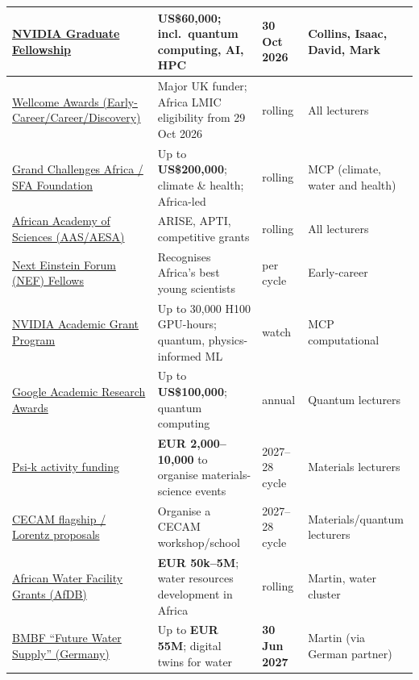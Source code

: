 \documentclass[11pt,a4paper]{article}
\begin{document}
\begin{longtable}{@{}p{3.4cm}p{5.6cm}p{2.2cm}p{2.7cm}@{}}
\midrule
\href{https://research.nvidia.com/graduate-fellowships}{NVIDIA Graduate Fellowship} & \textbf{US\$60{,}000}; incl.\ quantum computing, AI, HPC & \textbf{30 Oct 2026} & Collins, Isaac, David, Mark \\
\midrule
\href{https://wellcome.org/research-funding/guidance/prepare-to-apply/scheme-application-deadlines}{Wellcome Awards (Early-Career/Career/Discovery)} & Major UK funder; Africa LMIC eligibility from 29 Oct 2026 & rolling & All lecturers \\
\midrule
\href{https://scienceforafrica.foundation/}{Grand Challenges Africa / SFA Foundation} & Up to \textbf{US\$200{,}000}; climate \& health; Africa-led & rolling & MCP (climate, water and health) \\
\midrule
\href{https://calls.aasciences.africa/grants}{African Academy of Sciences (AAS/AESA)} & ARISE, APTI, competitive grants & rolling & All lecturers \\
\midrule
\href{https://en.wikipedia.org/wiki/Next_Einstein_Forum}{Next Einstein Forum (NEF) Fellows} & Recognises Africa's best young scientists & per cycle & Early-career \\
\midrule
\href{https://www.nvidia.com/en-us/industries/higher-education-research/academic-grant-program/}{NVIDIA Academic Grant Program} & Up to 30{,}000 H100 GPU-hours; quantum, physics-informed ML & watch & MCP computational \\
\midrule
\href{https://research.google/programs-and-events/google-academic-research-awards/}{Google Academic Research Awards} & Up to \textbf{US\$100{,}000}; quantum computing & annual & Quantum lecturers \\
\midrule
\href{https://psi-k.net/workshop-funding/}{Psi-k activity funding} & \textbf{EUR 2{,}000--10{,}000} to organise materials-science events & 2027--28 cycle & Materials lecturers \\
\midrule
\href{https://www.cecam.org/submit-flagship-proposal}{CECAM flagship / Lorentz proposals} & Organise a CECAM workshop/school & 2027--28 cycle & Materials/quantum lecturers \\
\midrule
\href{https://www.fundsforngos.org/latest-funds-for-ngos/the-african-water-facility-grants-on-water-and-climate-change/}{African Water Facility Grants (AfDB)} & \textbf{EUR 50k--5M}; water resources development in Africa & rolling & Martin, water cluster \\
\midrule
\href{https://www.grantbite.com/en/funding/bmbf-future-water-supply-research-funding}{BMBF ``Future Water Supply'' (Germany)} & Up to \textbf{EUR 55M}; digital twins for water & \textbf{30 Jun 2027} & Martin (via German partner) \\

\end{longtable}
\end{document}
